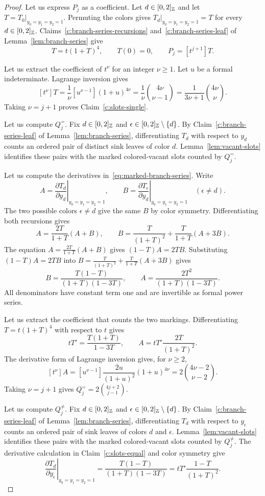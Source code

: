 \begin{proof}
Let us express $P_j$ as a coefficient.
Let $d\in[0,2]_{\mathbb Z}$ and let $T=T_0|_{y_0=y_1=y_2=1}$.
Permuting the colors gives $T_d|_{y_0=y_1=y_2=1}=T$ for every $d\in[0,2]_{\mathbb Z}$.
Claims~\ref{c:branch-series-recursions} and~\ref{c:branch-series-leaf} of Lemma~\ref{lem:branch-series} give
\[
 T=t(1+T)^4,\qquad T(0)=0,\qquad P_j=[t^{j+1}]T.
\]

Let us extract the coefficient of $t^\nu$ for an integer $\nu\ge1$. Let $u$ be a formal indeterminate.
Lagrange inversion gives
\[
 [t^\nu]T
 =\frac1\nu[u^{\nu-1}](1+u)^{4\nu}
 =\frac1\nu\binom{4\nu}{\nu-1}
 =\frac1{3\nu+1}\binom{4\nu}{\nu}.
\]
Taking $\nu=j+1$ proves Claim~\ref{c:slots-single}.

 Let us compute $Q_j^{=}$.
Fix $d\in[0,2]_{\mathbb Z}$ and $\epsilon\in[0,2]_{\mathbb Z}\setminus\{d\}$.
By Claim~\ref{c:branch-series-leaf} of Lemma~\ref{lem:branch-series}, differentiating $T_d$ with respect to $y_d$ counts an ordered pair of distinct sink leaves of color $d$.
Lemma~\ref{lem:vacant-slots} identifies these pairs with the marked colored-vacant slots counted by $Q_j^{=}$.

Let us compute the derivatives in~\eqref{eq:marked-branch-series}.
Write
\[
 A=\left.\frac{\partial T_d}{\partial y_d}\right|_{y_0=y_1=y_2=1},\qquad
 B=\left.\frac{\partial T_\epsilon}{\partial y_d}\right|_{y_0=y_1=y_2=1}
 \quad(\epsilon\ne d).
\]
The two possible colors $\epsilon\ne d$ give the same $B$ by color symmetry.
Differentiating both recursions gives
\[
 A=\frac{2T}{1+T}(A+B),\qquad
 B=\frac{T}{(1+T)^2}+\frac{T}{1+T}(A+3B).
\]
The equation $A=\frac{2T}{1+T}(A+B)$ gives $(1-T)A=2TB$.
Substituting $(1-T)A=2TB$ into $B=\frac{T}{(1+T)^2}+\frac{T}{1+T}(A+3B)$ gives
\[
 B=\frac{T(1-T)}{(1+T)(1-3T)},\qquad
 A=\frac{2T^2}{(1+T)(1-3T)}.
\]
All denominators have constant term one and are invertible as formal power series.

Let us extract the coefficient that counts the two markings.
Differentiating $T=t(1+T)^4$ with respect to $t$ gives
\[
 tT'=\frac{T(1+T)}{1-3T},\qquad A=tT'\frac{2T}{(1+T)^2}.
\]
The derivative form of Lagrange inversion gives, for $\nu\ge2$,
\[
 [t^\nu]A=[u^{\nu-1}]\frac{2u}{(1+u)^2}(1+u)^{4\nu}
 =2\binom{4\nu-2}{\nu-2}.
\]
Taking $\nu=j+1$ gives $Q_j^{=}=2\binom{4j+2}{j-1}$.

 Let us compute $Q_j^{\ne}$.
Fix $d\in[0,2]_{\mathbb Z}$ and $\epsilon\in[0,2]_{\mathbb Z}\setminus\{d\}$.
By Claim~\ref{c:branch-series-leaf} of Lemma~\ref{lem:branch-series}, differentiating $T_d$ with respect to $y_\epsilon$ counts an ordered pair of sink leaves of colors $d$ and $\epsilon$.
Lemma~\ref{lem:vacant-slots} identifies these pairs with the marked colored-vacant slots counted by $Q_j^{\ne}$.
The derivative calculation in Claim~\ref{c:slots-equal} and color symmetry give
\[
 \left.\frac{\partial T_d}{\partial y_\epsilon}\right|_{y_0=y_1=y_2=1}
 =\frac{T(1-T)}{(1+T)(1-3T)}
 =tT'\frac{1-T}{(1+T)^2}.
\]


\end{proof}
